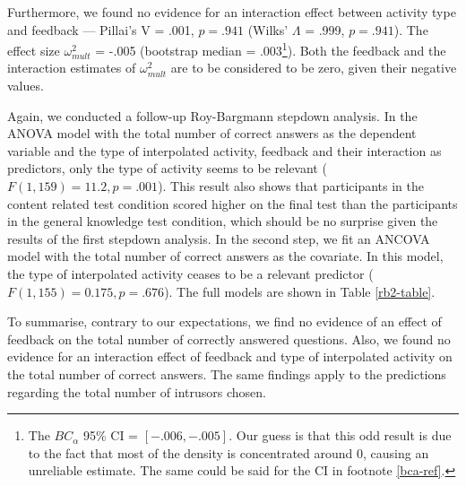 \documentclass[../main.tex]{subfiles}
\begin{document}
Furthermore, we found no evidence for an interaction effect between
activity type and feedback --- Pillai's V = .001, \(p = .941\) (Wilks'
\(\Lambda\) = .999, \(p = .941\)). The effect size \(\omega^2_{mult}\) =
-.005 (bootstrap median = .003\footnote{
The \(BC_\alpha\) 95\% CI = \([-.006,
-.005]\).
Our guess is that this odd result is due to the fact that most of the density is concentrated
around 0, causing an unreliable estimate. The same could be said for the CI in
footnote \ref{bca-ref}.}). Both the feedback and the interaction
estimates of \(\omega^2_{mult}\) are to be considered to be zero, given
their negative values.

Again, we conducted a follow-up Roy-Bargmann stepdown analysis. In the
ANOVA model with the total number of correct answers as the dependent
variable and the type of interpolated activity, feedback and their
interaction as predictors, only the type of activity seems to be
relevant (\(F(1, 159) = 11.2, p = .001\)). This result also shows that
participants in the content related test condition scored higher on the
final test than the participants in the general knowledge test
condition, which should be no surprise given the results of the first
stepdown analysis. In the second step, we fit an ANCOVA model with the
total number of correct answers as the covariate. In this model, the
type of interpolated activity ceases to be a relevant predictor
(\(F(1, 155) = 0.175, p = .676\)). The full models are shown in Table
\ref{rb2-table}.

To summarise, contrary to our expectations, we find no evidence of an
effect of feedback on the total number of correctly answered questions.
Also, we found no evidence for an interaction effect of feedback and
type of interpolated activity on the total number of correct answers.
The same findings apply to the predictions regarding the total number of
intrusors chosen.
\end{document}
